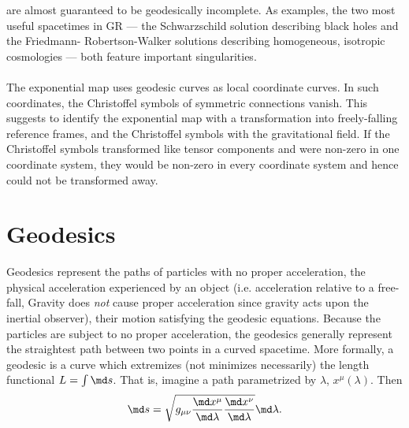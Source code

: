 are almost guaranteed to be geodesically incomplete. As examples, the two most useful
spacetimes in GR — the Schwarzschild solution describing black holes and the Friedmann-
Robertson-Walker solutions describing homogeneous, isotropic cosmologies — both feature
important singularities.
\\
\\
The exponential map uses geodesic curves as local coordinate curves. In such coordinates, the
Christoffel symbols of symmetric connections vanish. This suggests to identify the exponential
map with a transformation into freely-falling reference frames, and the Christoffel symbols with
the gravitational field. If the Christoffel symbols transformed like tensor components and were
non-zero in one coordinate system, they would be non-zero in every coordinate system and
hence could not be transformed away.









\section{Geodesics}
Geodesics represent the paths of particles with no proper acceleration, the physical acceleration experienced by an object (i.e. acceleration relative to a free-fall, Gravity does \emph{not} cause proper acceleration since gravity acts upon the inertial observer), their motion satisfying the geodesic equations. Because the particles are subject to no proper acceleration, the geodesics generally represent the straightest path between two points in a curved spacetime.
More formally, a geodesic is a curve which extremizes (not minimizes necessarily) the length functional $L=\int \md s$. That is, imagine a path parametrized by $\lambda$, $x^{\mu} (\lambda)$. Then
\begin{equation}
	\md s = \sqrt{g_{\mu \nu} \frac{\md x^{\mu}}{\md \lambda} \frac{\md x^{\nu}}{\md \lambda}} \md \lambda.
\end{equation}

